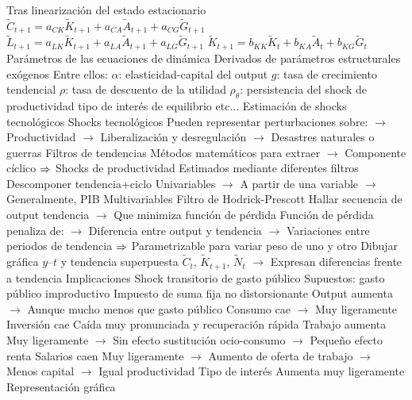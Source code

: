 \documentclass{nuevotema}
\begin{document}
\begin{esquemal}
				\4[] Tras linearización del estado estacionario
				\4[] $\tilde{C}_{t+1} = a_{CK}\tilde{K}_{t+1} + a_{CA}\tilde{A}_{t+1} + a_{CG} \tilde{G}_{t+1}$
				\4[] $\tilde{L}_{t+1} = a_{LK}\tilde{K}_{t+1} + a_{LA}\tilde{A}_{t+1} + a_{LG} \tilde{G}_{t+1}$
				\4[] $\tilde{K}_{t+1} = b_{KK}\tilde{K}_{t} + b_{KA}\tilde{A}_{t} + b_{KG} \tilde{G}_{t}$
				\4 Parámetros de las ecuaciones de dinámica
				\4[] Derivados de parámetros estructurales exógenos
				\4[] Entre ellos:
				\4[] $\alpha$: elasticidad-capital del output
				\4[] $g$: tasa de crecimiento tendencial
				\4[] $\rho$: tasa de descuento de la utilidad
				\4[] $\rho_\theta$: persistencia del shock de productividad
				\4[] tipo de interés de equilibrio
				\4[] etc...
			\3 Estimación de shocks tecnológicos
				\4 Shocks tecnológicos
				\4[] Pueden representar perturbaciones sobre:
				\4[] $\to$  Productividad
				\4[] $\to$ Liberalización y desregulación
				\4[] $\to$ Desastres naturales o guerras
				\4 Filtros de tendencias
				\4[] Métodos matemáticos para extraer
				\4[] $\to$ Componente cíclico
				\4[] $\Rightarrow$ Shocks de productividad
				\4 Estimados mediante diferentes filtros
				\4[] Descomponer tendencia+ciclo
				\4[] Univariables
				\4[] $\to$ A partir de una variable
				\4[] $\to$ Generalmente, PIB
				\4[] Multivariables
				\4 Filtro de Hodrick-Prescott
				\4[] Hallar secuencia de output tendencia
				\4[] $\to$ Que minimiza función de pérdida
				\4[] Función de pérdida penaliza de:
				\4[] $\to$ Diferencia entre output y tendencia
				\4[] $\to$ Variaciones entre periodos de tendencia
				\4[] $\Rightarrow$ Parametrizable para variar peso de uno y otro
				\4[] Dibujar gráfica $y$--$t$ y tendencia superpuesta
				\4[] $\tilde{C}_t$, $\tilde{K}_{t+1}$, $\tilde{N}_t$
				\4[] $\to$ Expresan diferencias frente a tendencia
		\2 Implicaciones
			\3 Shock transitorio de gasto público
				\4 Supuestos:
				\4[] gasto público improductivo
				\4[] Impuesto de suma fija no distorsionante
				\4 Output aumenta
				\4[] $\to$ Aunque mucho menos que gasto público
				\4 Consumo cae
				\4[] $\to$ Muy ligeramente
				\4 Inversión cae
				\4[] Caída muy pronunciada y recuperación rápida
				\4 Trabajo aumenta
				\4[] Muy ligeramente
				\4[] $\to$ Sin efecto sustitución ocio-consumo
				\4[] $\to$ Pequeño efecto renta
				\4 Salarios caen
				\4[] Muy ligeramente
				\4[] $\to$ Aumento de oferta de trabajo
				\4[] $\to$ Menos capital
				\4[] $\to$ Igual productividad
				\4 Tipo de interés
				\4[] Aumenta muy ligeramente
				\4 Representación gráfica
				\4[] 

\end{esquemal}
\end{document}
